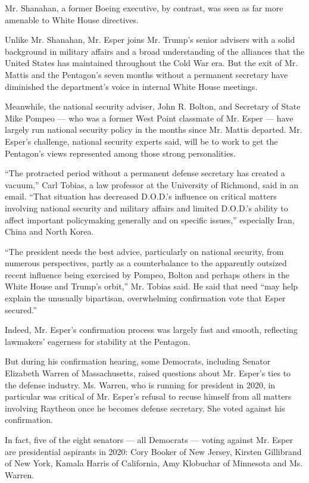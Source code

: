 Mr. Shanahan, a former Boeing executive, by contrast, was seen as far
more amenable to White House directives.

Unlike Mr. Shanahan, Mr. Esper joins Mr. Trump's senior advisers with a
solid background in military affairs and a broad understanding of the
alliances that the United States has maintained throughout the Cold War
era. But the exit of Mr. Mattis and the Pentagon's seven months without
a permanent secretary have diminished the department's voice in internal
White House meetings.

Meanwhile, the national security adviser, John R. Bolton, and Secretary
of State Mike Pompeo --- who was a former West Point classmate of Mr.
Esper --- have largely run national security policy in the months since
Mr. Mattis departed. Mr. Esper's challenge, national security experts
said, will be to work to get the Pentagon's views represented among
those strong personalities.

``The protracted period without a permanent defense secretary has
created a vacuum,'' Carl Tobias, a law professor at the University of
Richmond, said in an email. ``That situation has decreased D.O.D.'s
influence on critical matters involving national security and military
affairs and limited D.O.D.'s ability to affect important policymaking
generally and on specific issues,'' especially Iran, China and North
Korea.

``The president needs the best advice, particularly on national
security, from numerous perspectives, partly as a counterbalance to the
apparently outsized recent influence being exercised by Pompeo, Bolton
and perhaps others in the White House and Trump's orbit,'' Mr. Tobias
said. He said that need ``may help explain the unusually bipartisan,
overwhelming confirmation vote that Esper secured.''

Indeed, Mr. Esper's confirmation process was largely fast and smooth,
reflecting lawmakers' eagerness for stability at the Pentagon.

But during his confirmation hearing, some Democrats, including Senator
Elizabeth Warren of Massachusetts, raised questions about Mr. Esper's
ties to the defense industry. Ms. Warren, who is running for president
in 2020, in particular was critical of Mr. Esper's refusal to recuse
himself from all matters involving Raytheon once he becomes defense
secretary. She voted against his confirmation.

In fact, five of the eight senators --- all Democrats --- voting against
Mr. Esper are presidential aspirants in 2020: Cory Booker of New Jersey,
Kirsten Gillibrand of New York, Kamala Harris of California, Amy
Klobuchar of Minnesota and Ms. Warren.

